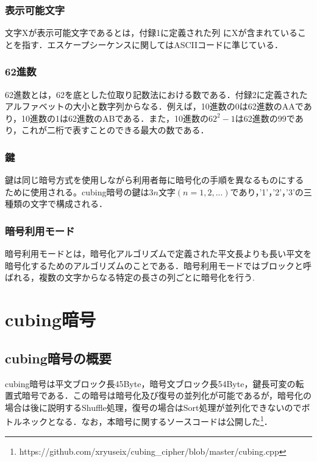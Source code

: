 \documentclass[a4j,titlepage]{jsarticle}
\newcommand{\code}[1]{ \texttt{\detokenize{#1}} }
\begin{document}
\subsubsection{表示可能文字}
文字Xが表示可能文字であるとは，付録1に定義された列\code{printable_table}にXが含まれていることを指す．エスケープシーケンスに関してはASCIIコードに準じている．

\subsubsection{62進数}
62進数とは，62を底とした位取り記数法における数である．付録2に定義されたアルファベットの大小と数字列からなる．例えば，10進数の0は62進数のAAであり，10進数の1は62進数のABである．また，10進数の\(62^2-1\)は62進数の99であり，これが二桁で表すことのできる最大の数である．

\subsubsection{鍵}
鍵は同じ暗号方式を使用しながら利用者毎に暗号化の手順を異なるものにするために使用される。cubing暗号の鍵は\(3n\)文字\((n=1,2,...)\)であり，'1'，'2'，'3'の三種類の文字で構成される．

\subsubsection{暗号利用モード}
暗号利用モードとは，暗号化アルゴリズムで定義された平文長よりも長い平文を暗号化するためのアルゴリズムのことである．暗号利用モードではブロックと呼ばれる，複数の文字からなる特定の長さの列ごとに暗号化を行う.

%
\section{cubing暗号}
\subsection{cubing暗号の概要}
cubing暗号は平文ブロック長45Byte，暗号文ブロック長54Byte，鍵長可変の転置式暗号である．この暗号は暗号化及び復号の並列化が可能であるが，暗号化の場合は後に説明するShuffle処理，復号の場合はSort処理が並列化できないのでボトルネックとなる．なお，本暗号に関するソースコードは公開した\footnote{https://github.com/xryuseix/cubing\_cipher/blob/master/cubing.cpp}．
\end{document}
